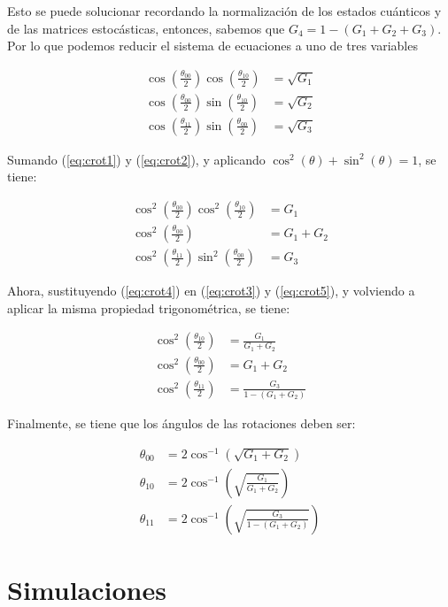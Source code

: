 Esto se puede solucionar recordando la normalización de los estados cuánticos y de las matrices estocásticas, entonces, sabemos que $G_4 = 1 - (G_1 + G_2 + G_3)$. Por lo que podemos reducir el sistema de ecuaciones a uno de tres variables

\begin{align}
    \cos(\frac{\theta_{00}}{2}) \cos(\frac{\theta_{10}}{2}) &= \sqrt{G_1}
    \label{eq:crot1} \\
    \cos(\frac{\theta_{00}}{2}) \sin(\frac{\theta_{10}}{2}) &= \sqrt{G_2}
    \label{eq:crot2} \\
    \cos(\frac{\theta_{11}}{2}) \sin(\frac{\theta_{00}}{2}) &= \sqrt{G_3}
\end{align}

Sumando (\ref{eq:crot1}) y (\ref{eq:crot2}), y aplicando $\cos^2(\theta) + \sin^2(\theta) = 1$, se tiene:

\begin{align}
    \cos^2(\frac{\theta_{00}}{2}) \cos^2(\frac{\theta_{10}}{2}) &= G_1
    \label{eq:crot3} \\
    \cos^2(\frac{\theta_{00}}{2}) &= G_1 + G_2
    \label{eq:crot4} \\
    \cos^2(\frac{\theta_{11}}{2}) \sin^2(\frac{\theta_{00}}{2}) &= G_3
    \label{eq:crot5}
\end{align}

Ahora, sustituyendo (\ref{eq:crot4}) en (\ref{eq:crot3}) y (\ref{eq:crot5}), y volviendo a aplicar la misma propiedad trigonométrica, se tiene:

\begin{align}
    \cos^2(\frac{\theta_{10}}{2}) &= \frac{G_1}{G_1 + G_2} \\
    \cos^2(\frac{\theta_{00}}{2}) &= G_1 + G_2 \\
    \cos^2(\frac{\theta_{11}}{2}) &= \frac{G_3}{1-(G_1 + G_2)}
\end{align}

Finalmente, se tiene que los ángulos de las rotaciones deben ser:

\begin{align}
    \theta_{00} &= 2 \cos^{-1}\left(\sqrt{G_1 + G_2}\right) \\
    \theta_{10} &= 2 \cos^{-1}\left(\sqrt{\frac{G_1}{G_1 + G_2}}\right) \\
    \theta_{11} &= 2 \cos^{-1}\left(\sqrt{\frac{G_3}{1 - (G_1 + G_2)}}\right)
\end{align}

\section{Simulaciones}

